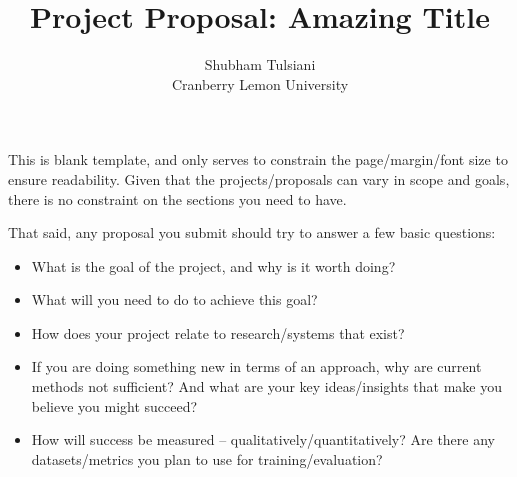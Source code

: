 \documentclass[10pt,letterpaper]{article}
\title{
\Large{\textbf{Project Proposal: Amazing Title}}
}
\date{}
\author{
Shubham Tulsiani
\\ Cranberry Lemon University
}
\begin{document}
\maketitle
\thispagestyle{empty}

This is blank template, and only serves to constrain the page/margin/font size to ensure readability. Given that the projects/proposals can vary  in scope and goals, there is no constraint on the sections you need to have.

That said, any proposal you submit should try to answer a few basic questions:
\begin{itemize}
    \item What is the goal of the project, and why is it worth doing?
    \item What will you need to do to achieve this goal? 
    \item How does your project relate to research/systems that exist?
    \item If you are doing something new in terms of an approach, why are current methods not sufficient? And what are your key ideas/insights that make you believe you might succeed?
    \item How will success be measured -- qualitatively/quantitatively? Are there any datasets/metrics you plan to use for training/evaluation?
\end{itemize}
\end{document}
